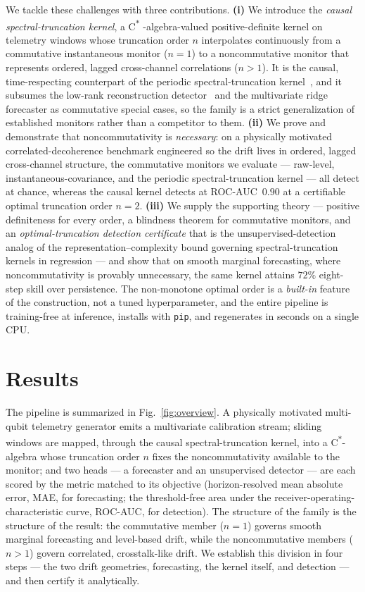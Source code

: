 \documentclass[
  aps,
  prresearch,
  reprint,
  amsmath,
  amssymb,
  nofootinbib,
  floatfix,
]{revtex4-2}
\begin{document}
We tackle these challenges with three contributions. \textbf{(i)} We introduce the
\emph{causal spectral-truncation kernel}, a C\textsuperscript{$\ast$}%
-algebra-valued positive-definite kernel on telemetry windows whose truncation
order $n$ interpolates continuously from a commutative instantaneous monitor
($n{=}1$) to a noncommutative monitor that represents ordered, lagged
cross-channel correlations ($n{>}1$). It is the causal, time-respecting
counterpart of the periodic spectral-truncation
kernel~\citep{hashimoto2024spectral}, and it subsumes the low-rank reconstruction
detector~\citep{malhotra2016lstmad} and the multivariate ridge forecaster as
commutative special cases, so the family is a strict generalization of established
monitors rather than a competitor to them. \textbf{(ii)} We prove and demonstrate
that noncommutativity is \emph{necessary}: on a physically motivated
correlated-decoherence benchmark engineered so the drift lives in ordered, lagged
cross-channel structure, the commutative monitors we evaluate --- raw-level,
instantaneous-covariance, and the periodic spectral-truncation kernel --- all
detect at chance, whereas the causal kernel detects at ROC-AUC~$0.90$ at a
certifiable optimal truncation order $n{=}2$. \textbf{(iii)} We supply the
supporting theory --- positive definiteness for every order, a blindness theorem
for commutative monitors, and an \emph{optimal-truncation detection certificate}
that is the unsupervised-detection analog of the representation--complexity bound
governing spectral-truncation kernels in regression --- and show that on smooth
marginal forecasting, where noncommutativity is provably unnecessary, the same
kernel attains $72\%$ eight-step skill over persistence. The non-monotone optimal
order is a \emph{built-in} feature of the construction, not a tuned hyperparameter,
and the entire pipeline is training-free at inference, installs with \texttt{pip},
and regenerates in seconds on a single CPU.

\section{Results}

The pipeline is summarized in Fig.~\ref{fig:overview}. A physically motivated
multi-qubit telemetry generator emits a multivariate calibration stream; sliding
windows are mapped, through the causal spectral-truncation kernel, into a
C\textsuperscript{$\ast$}-algebra whose truncation order $n$ fixes the
noncommutativity available to the monitor; and two heads --- a forecaster and an
unsupervised detector --- are each scored by the metric matched to its objective
(horizon-resolved mean absolute error, MAE, for forecasting; the threshold-free
area under the receiver-operating-characteristic curve, ROC-AUC, for detection).
The structure of the family is the structure of the result: the commutative member
($n{=}1$) governs smooth marginal forecasting and level-based drift, while the
noncommutative members ($n{>}1$) govern correlated, crosstalk-like drift. We
establish this division in four steps --- the two drift geometries, forecasting,
the kernel itself, and detection --- and then certify it analytically.
\end{document}
